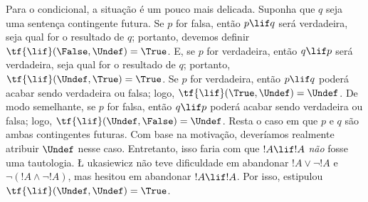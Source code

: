 \documentclass[../../../include/open-logic-section]{subfiles}
\begin{document}
Para o condicional, a situação é um pouco mais delicada. Suponha que $q$
seja uma sentença contingente futura. Se $p$ for falsa, então $p \lif q$
será verdadeira, seja qual for o resultado de $q$; portanto, devemos definir
$\tf{\lif}(\False, \Undef) = \True$. E, se $p$ for verdadeira, então
$q \lif p$ será verdadeira, seja qual for o resultado de $q$; portanto,
$\tf{\lif}(\Undef, \True) = \True$. Se $p$ for verdadeira, então $p
\lif q$ poderá acabar sendo verdadeira ou falsa; logo, $\tf{\lif}(\True,
\Undef) = \Undef$. De modo semelhante, se $p$ for falsa, então $q
\lif p$ poderá acabar sendo verdadeira ou falsa; logo,
$\tf{\lif}(\Undef, \False) = \Undef$. Resta o
caso em que $p$ e $q$ são ambas contingentes futuras. Com base na
motivação, deveríamos realmente atribuir $\Undef$ nesse caso.
Entretanto, isso faria com que $!A \lif !A$ \emph{não} fosse uma tautologia. \L
ukasiewicz não teve dificuldade em abandonar $!A \lor \lnot !A$ e $\lnot(!A
\land \lnot !A)$, mas hesitou em abandonar $!A \lif !A$. Por isso,
estipulou $\tf{\lif}(\Undef, \Undef) =
\True$.
\end{document}
